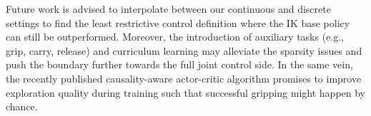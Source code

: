 \documentclass[conference,a4paper]{IEEEtran}
\begin{document}
Future work is advised to interpolate between our continuous and discrete settings to find the least restrictive control definition where the IK base policy can still be outperformed. Moreover, the introduction of auxiliary tasks (e.g., grip, carry, release) and curriculum learning may alleviate the sparsity issues and push the boundary further towards the full joint control side.  In the same vein, the recently published causality-aware actor-critic algorithm \cite{ji_ace_2024} promises to improve exploration quality during training such that successful gripping might happen by chance.

\clearpage



\end{document}
